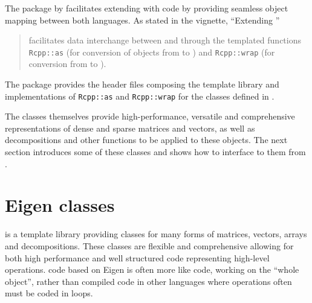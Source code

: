 \documentclass[shortnames,article]{jss}
\begin{document}
The  package by \citet{JSS:Rcpp,CRAN:Rcpp} facilitates extending
 with  code by providing seamless object mapping
between both languages.
%
As stated in the  \citep{CRAN:Rcpp} vignette, ``Extending ''
\begin{quote}
   facilitates data interchange between  and
   through the templated functions \texttt{Rcpp::as} (for
  conversion of objects from  to ) and
  \texttt{Rcpp::wrap} (for conversion from  to ).
\end{quote}
The  package provides the header files composing the
  template library and implementations of
\texttt{Rcpp::as} and \texttt{Rcpp::wrap} for the 
classes defined in .

The  classes themselves provide high-performance,
versatile and comprehensive representations of dense and sparse
matrices and vectors, as well as decompositions and other functions
to be applied to these objects.  The next section introduces some
of these classes and shows how to interface to them from .

\section{Eigen classes}
\label{sec:eclasses}

 \citep*{Eigen:Web} is a  template
library providing classes for many forms of matrices, vectors, arrays
and decompositions.  These classes are flexible and comprehensive
allowing for both high performance and well structured code
representing high-level operations.  code based on Eigen
is often more like  code, working on the ``whole object'',
rather than compiled code in other languages where operations often must be
coded in loops.
\end{document}
